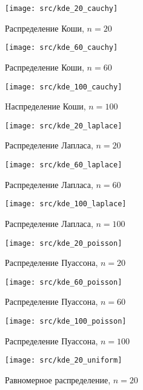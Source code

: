 \documentclass[a4paper]{article}
\begin{document}
\begin{figure}[H]
	\centering
	{\texttt{[image: src/kde\_20\_cauchy]}}
		\caption{Распределение Коши, $n=20$}
		\label{fig:kde_cauchy_20}
	\end{figure}

\begin{figure}[H]
	\centering
	{\texttt{[image: src/kde\_60\_cauchy]}}
		\caption{Распределение Коши, $n=60$}
		\label{fig:kde_cauchy_60}
	\end{figure}

\begin{figure}[H]
	\centering
	{\texttt{[image: src/kde\_100\_cauchy]}}
		\caption{Hаспределение Коши, $n=100$}
		\label{fig:kde_cauchy_100}
	\end{figure}

\begin{figure}[H]
	\centering
	{\texttt{[image: src/kde\_20\_laplace]}}
		\caption{Распределение Лапласа, $n=20$}
		\label{fig:kde_laplace_20}
	\end{figure}

\begin{figure}[H]
	\centering
	{\texttt{[image: src/kde\_60\_laplace]}}
		\caption{Распределение Лапласа, $n=60$}
		\label{fig:kde_laplace_60}
	\end{figure}

\begin{figure}[H]
	\centering
	{\texttt{[image: src/kde\_100\_laplace]}}
		\caption{Распределение Лапласа, $n=100$}
		\label{fig:kde_laplace_100}
	\end{figure}

\begin{figure}[H]
	\centering
	{\texttt{[image: src/kde\_20\_poisson]}}
		\caption{Распределение Пуассона, $n=20$}
		\label{fig:kde_poisson_20}
	\end{figure}

\begin{figure}[H]
	\centering
	{\texttt{[image: src/kde\_60\_poisson]}}
		\caption{Распределение Пуассона, $n=60$}
		\label{fig:kde_poisson_60}
	\end{figure}

\begin{figure}[H]
	\centering
	{\texttt{[image: src/kde\_100\_poisson]}}
		\caption{Распределение Пуассона, $n=100$}
		\label{fig:kde_poisson_100}
	\end{figure}

\begin{figure}[H]
	\centering
	{\texttt{[image: src/kde\_20\_uniform]}}
		\caption{Равномерное распределение, $n=20$}
		\label{fig:kde_uniform_20}
	\end{figure}
\end{document}
